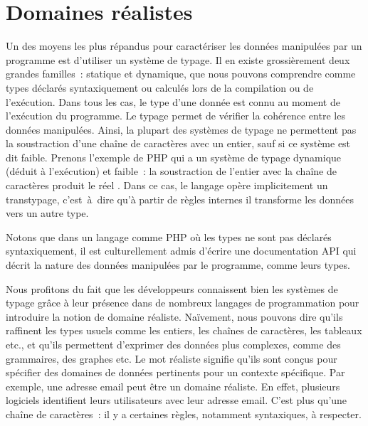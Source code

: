 \section{Domaines réalistes}
\label{section:language:realdoms}

Un des moyens les plus répandus pour caractériser les données manipulées par un
programme est d'utiliser un système de {\strong typage}. Il en existe
grossièrement deux grandes familles~: {\strong statique} et {\strong dynamique},
que nous pouvons comprendre comme types déclarés syntaxiquement ou calculés lors
de la compilation ou de l'exécution. Dans tous les cas, le type d'une donnée est
connu au moment de l'exécution du programme. Le typage permet de {\strong
vérifier} la cohérence entre les données manipulées. Ainsi, la plupart des
systèmes de typage ne permettent pas la soustraction d'une chaîne de caractères
avec un entier, sauf si ce système est dit faible. Prenons l'exemple de PHP qui
a un système de typage dynamique (déduit à l'exécution) et faible~: la
soustraction de l'entier  avec la chaîne de caractères 
produit le réel . Dans ce cas, le langage opère implicitement un
transtypage, c'est~à~dire qu'à partir de règles internes il transforme les
données vers un autre type.

Notons que dans un langage comme PHP où les types ne sont pas déclarés
syntaxiquement, il est culturellement admis d'écrire une documentation API qui
décrit la nature des données manipulées par le programme, comme leurs types.

Nous profitons du fait que les développeurs connaissent bien les systèmes de
typage grâce à leur présence dans de nombreux langages de programmation pour
introduire la notion de {\strong domaine réaliste}. Naïvement, nous pouvons dire
qu'ils raffinent les types usuels comme les entiers, les chaînes de caractères,
les tableaux etc., et qu'ils permettent d'exprimer des données plus complexes,
comme des grammaires, des graphes etc. Le mot {\strong réaliste} signifie qu'ils
sont conçus pour spécifier des domaines de données pertinents pour un contexte
spécifique. Par exemple, une adresse email peut être un domaine réaliste. En
effet, plusieurs logiciels identifient leurs utilisateurs avec leur adresse
email. C'est plus qu'une chaîne de caractères~: il y a certaines règles,
notamment syntaxiques, à respecter.

